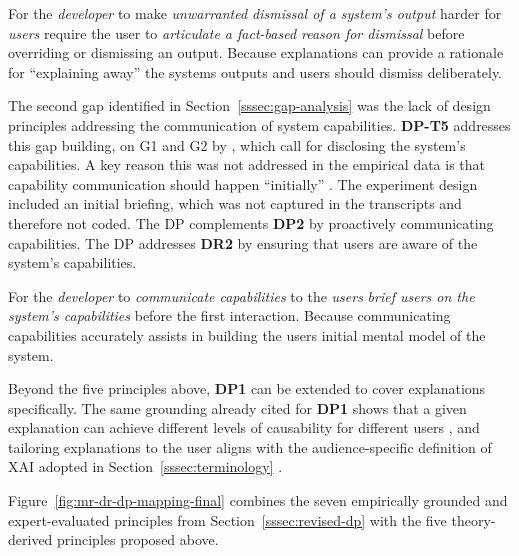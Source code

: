     {For the \textit{developer} to make \textit{unwarranted dismissal of a system's output} harder for \textit{users}}
    {require the user to \textit{articulate a fact-based reason for dismissal} before overriding or dismissing an output.}
    {Because explanations can provide a rationale for \enquote{explaining away} the systems outputs and users should dismiss deliberately.}

The second gap identified in Section~\ref{sssec:gap-analysis} was the lack of design principles addressing the communication of system capabilities. \textbf{DP-T5} addresses this gap building, on G1 and G2 by \textcite{Amershi2019}, which call for disclosing the system's capabilities. A key reason this was not addressed in the empirical data is that capability communication should happen \enquote{initially} \parencite{Amershi2019}. The experiment design included an initial briefing, which was not captured in the transcripts and therefore not coded. The \ac{DP} complements \textbf{DP2} by proactively communicating capabilities. The \ac{DP} addresses \textbf{DR2} by ensuring that users are aware of the system's capabilities.

    {For the \textit{developer} to \textit{communicate capabilities} to the \textit{users}}
    {\textit{brief users on the system's capabilities} before the first interaction.}
    {Because communicating capabilities accurately assists in building the users initial mental model of the system.}

Beyond the five principles above, \textbf{DP1} can be extended to cover explanations specifically. The same grounding already cited for \textbf{DP1} shows that a given explanation can achieve different levels of causability for different users \parencite{Shin2021}, and tailoring explanations to the user aligns with the audience-specific definition of \ac{XAI} adopted in Section~\ref{sssec:terminology} \parencite{Arrieta2020}.

Figure~\ref{fig:mr-dr-dp-mapping-final} combines the seven empirically grounded and expert-evaluated principles from Section~\ref{sssec:revised-dp} with the five theory-derived principles proposed above.

